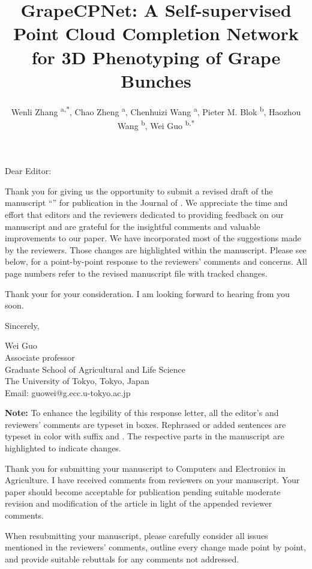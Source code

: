 \documentclass{ar2rc}
\title{GrapeCPNet: A Self-supervised Point Cloud Completion Network for 3D Phenotyping of Grape Bunches}
\author{
    Wenli Zhang \textsuperscript{a,*},
    Chao Zheng \textsuperscript{a},
    Chenhuizi Wang \textsuperscript{a},
    Pieter M. Blok \textsuperscript{b},
    Haozhou Wang \textsuperscript{b},
    Wei Guo \textsuperscript{b,*}
}
\begin{document}
\begin{center}
    \maketitle
\end{center}

\thedate

Dear Editor:

Thank you for giving us the opportunity to submit a revised draft of the manuscript ``\thetitle'' for publication in the Journal of \thejournal. We appreciate the time and effort that editors and the reviewers dedicated to providing feedback on our manuscript and are grateful for the insightful comments and valuable improvements to our paper. We have incorporated most of the suggestions made by the reviewers. Those changes are highlighted within the manuscript. Please see below, for a point-by-point response to the reviewers' comments and concerns. All page numbers refer to the revised manuscript file with tracked changes.

Thank your for your consideration. I am looking forward to hearing from you soon.

Sincerely,

Wei Guo\\
Associate professor\\
Graduate School of Agricultural and Life Science\\
The University of Tokyo, Tokyo, Japan\\
Email: guowei@g.ecc.u-tokyo.ac.jp

\vfill
\textbf{Note:} To enhance the legibility of this response letter, all the editor's and reviewers' comments are typeset in boxes. Rephrased or added sentences are typeset in color with suffix \added[id=R1]{} and \added[id=R2]{}. The respective parts in the manuscript are highlighted to indicate changes.

\editor

\begin{reviewercomment}
    Thank you for submitting your manuscript to Computers and Electronics in Agriculture. 
    I have received comments from reviewers on your manuscript. 
    Your paper should become acceptable for publication pending suitable moderate revision and modification of the article in light of the appended reviewer comments.

    When resubmitting your manuscript, please carefully consider all issues mentioned in the reviewers' comments, outline every change made point by point, and provide suitable rebuttals for any comments not addressed.
\end{reviewercomment}
\end{document}
